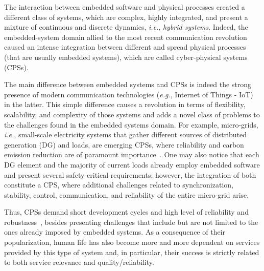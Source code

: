 \documentclass{acm_sen_article}
\begin{document}
The interaction between embedded software and physical processes created a different class of systems, which are complex, highly integrated, and present a mixture of continuous and discrete dynamics, {\it i.e.}, \textit{hybrid systems}. Indeed, the embedded-system domain allied to the most recent communication revolution caused an intense integration between different and spread physical processes (that are usually embedded systems), which are called cyber-physical systems (CPSs). 

The main difference between embedded systems and CPSs is indeed the strong presence of modern communication technologies ({\it e.g.}, Internet of Things - IoT) in the latter. This simple difference causes a revolution in terms of flexibility, scalability, and complexity of those systems and adds a novel class of problems to the challenges found in the embedded systems domain. For example, micro-grids, {\it i.e.}, small-scale electricity systems that gather different sources of distributed generation (DG) and loads, are emerging CPSs, where reliability and carbon emission reduction are of paramount importance~\cite{xu15}. One may also notice that each DG element and the majority of current loads already employ embedded software and present several safety-critical requirements; however, the integration of both constitute a CPS, where additional challenges related to synchronization, stability, control, communication, and reliability of the entire micro-grid arise.

Thus, CPSs demand short development cycles and high level of reliability and robustness~\cite{leeCPS,leeCPS2}, besides presenting challenges that include but are not limited to the ones already imposed by embedded systems. As a consequence of their popularization, human life has also become more and more dependent on services provided by this type of system and, in particular, their success is strictly related to both service relevance and quality/reliability. 
\end{document}
